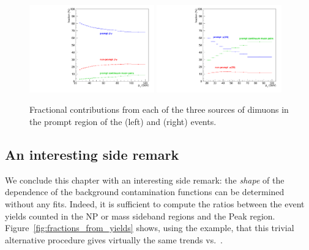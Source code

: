 \begin{figure}[h]
\centering
\includegraphics[width=0.48\textwidth]{Figures/chapter4/f_comp_corr-jpsi.pdf}
\includegraphics[width=0.48\textwidth]{Figures/chapter4/f_comp_corr-psip.pdf}
\caption{Fractional contributions from each of the three sources of dimuons
in the prompt region of the \jpsi (left) and \psip (right) events.}
\label{fig:fractions}
\end{figure}

\vfill\newpage

\subsection{An interesting side remark}

We conclude this chapter with an interesting side remark:
the \emph{shape} of the \pt dependence of the background contamination functions 
can be determined without any fits.
Indeed, it is sufficient to compute the ratios between the event yields 
counted in the NP or mass sideband regions and the Peak region.
Figure~\ref{fig:fractions_from_yields} shows, using the \jpsi example, that 
this trivial alternative procedure gives virtually the same trends vs.\ \pt.

